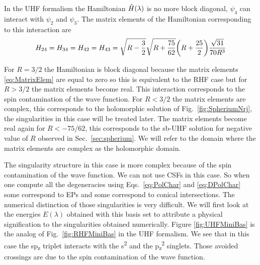 \documentclass[11pt,a4paper]{article}
\newcommand{\hH}{\Hat{H}}
\begin{document}
In the UHF formalism the Hamiltonian $\hH(\lambda)$ is no more block diagonal, $\psi_4$ can interact with $\psi_2$ and $\psi_3$. The matrix elements of the Hamiltonian corresponding to this interaction are
\begin{equation}\label{eq:MatrixElem}
	H_{24}=H_{34}=H_{42}=H_{43}=\sqrt{R-\frac{3}{2}}\sqrt{R+\frac{75}{62}}\qty(R+\frac{25}{2})\frac{\sqrt{31}}{70R^3}
\end{equation}

For $R=3/2$ the Hamiltonian is block diagonal because the matrix elements \eqref{eq:MatrixElem} are equal to zero so this is equivalent to the RHF case but for $R>3/2$ the matrix elements become real. This interaction corresponds to the spin contamination of the wave function. For $R<3/2$ the matrix elements are complex, this corresponds to the holomorphic solution of Fig.~\ref{fig:SpheriumNrj}, the singularities in this case will be treated later. The matrix elements become real again for $R<-75/62$, this corresponds to the sb-UHF solution for negative value of $R$ observed in Sec.~\ref{sec:spherium}. We will refer to the domain where the matrix elements are complex as the holomorphic domain.

The singularity structure in this case is more complex because of the spin contamination of the wave function. We can not use CSFs in this case. So when one compute all the degeneracies using Eqs.~\eqref{eq:PolChar} and \eqref{eq:DPolChar} some correspond to EPs and some correspond to conical intersections. The numerical distinction of those singularities is very difficult. We will first look at the energies $E(\lambda)$ obtained with this basis set to attribute a physical signification to the singularities obtained numerically.
Figure \ref{fig:UHFMiniBas} is the analog of Fig.~\ref{fig:RHFMiniBas} in the UHF formalism. We see that in this case the sp\textsubscript{z} triplet interacts with the s\textsuperscript{2} and the p\textsubscript{z}\textsuperscript{2} singlets. Those avoided crossings are due to the spin contamination of the wave function.
\end{document}
